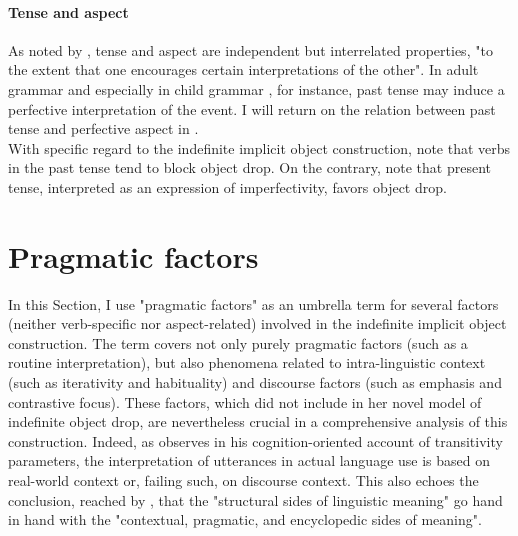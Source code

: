 \paragraph{Tense and aspect}
As noted by \textcite[68]{Medina2007}, tense and aspect are independent but interrelated properties, "to the extent that one encourages certain interpretations of the other". In adult grammar \parencite{comrie1976aspect} and especially in child grammar \parencite{wagner2001aspectual}, for instance, past tense may induce a perfective interpretation of the event. I will return on the relation between past tense and perfective aspect in .\\
With specific regard to the indefinite implicit object construction, \textcite{Dixon1992, Goldberg2005a, Glass2020} note that verbs in the past tense tend to block object drop. On the contrary, \textcite[9]{Garcia-VelascoMunoz2002} note that present tense, interpreted as an expression of imperfectivity, favors object drop.


\section{Pragmatic factors} 

In this Section, I use "pragmatic factors" as an umbrella term for several factors (neither verb-specific nor aspect-related) involved in the indefinite implicit object construction. The term covers not only purely pragmatic factors (such as a routine interpretation), but also phenomena related to intra-linguistic context (such as iterativity and habituality) and discourse factors (such as emphasis and contrastive focus). These factors, which \textcite{Medina2007} did not include in her novel model of indefinite object drop, are nevertheless crucial in a comprehensive analysis of this construction. Indeed, as \textcite[54]{delancey1987transitivity} observes in his cognition-oriented account of transitivity parameters, the interpretation of utterances in actual language use is based on real-world context or, failing such, on discourse context. This also echoes the conclusion, reached by \textcite[176]{Prytz2016}, that the "structural sides of linguistic meaning" go hand in hand with the "contextual, pragmatic, and encyclopedic sides of meaning".

